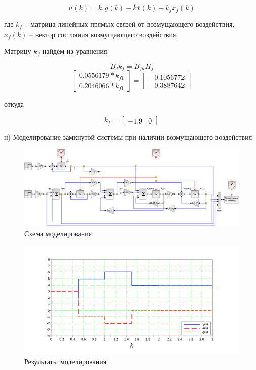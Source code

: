 \documentclass[a4paper,14pt]{extreport}
\begin{document}
\begin{equation}
	u(k)= k_1 g(k)  - \overline{k} \overline{x} (k) - k_f x_f  (k)
\end{equation}

где $k_f$ -- матрица линейных прямых связей от возмущающего воздействия, $x_f ( k )$ -- вектор состояния возмущающего воздействия.

Матрицу $k_f$ найдем из уравнения:

\begin{equation}
	B_d k_f = B_{fd} H_f
\end{equation}
\begin{equation}
	\begin{bmatrix}
    0.0556179   * k_{f1} \\
0.2046066  * k_{f1} 
	\end{bmatrix}
	=
	\begin{bmatrix}
	 - 0.1056772 \\ 
	- 0.3887642  
	\end{bmatrix}
\end{equation}

откуда

\begin{equation}
	k_f = 
	\begin{bmatrix}
	-1.9 & 0
	\end{bmatrix}
\end{equation}

н) Моделирование замкнутой системы при наличии возмущающего воздействия

\begin{figure}[H]
	\center\includegraphics[width=1	\linewidth]{model_f.png}
	\caption{Схема моделирования}	
	\label{fig:scr1}
\end{figure}
\begin{figure}[H]
	\center\includegraphics[width=1\linewidth]{model_f_res.png}
	\caption{Результаты моделирования }
	\label{fig:scr1}
\end{figure}
\end{document}
